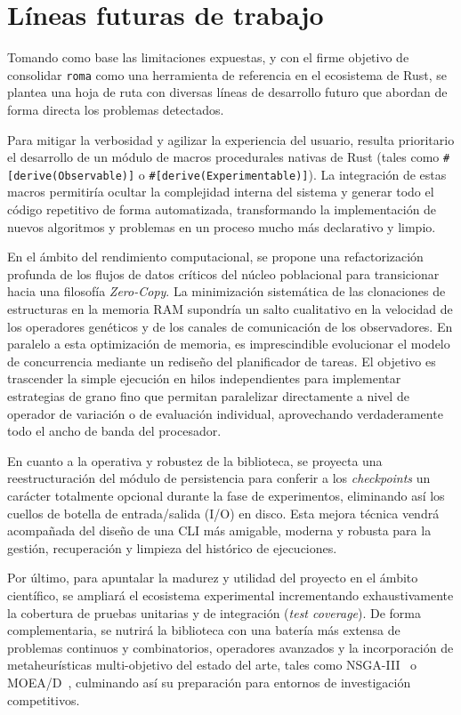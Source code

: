 \documentclass[12pt,a4paper,twoside,openright]{book}
\begin{document}
\section{Líneas futuras de trabajo}
    Tomando como base las limitaciones expuestas, y con el firme objetivo de consolidar \texttt{roma} como una herramienta de referencia en el ecosistema de Rust, se plantea una hoja de ruta con diversas líneas de desarrollo futuro que abordan de forma directa los problemas detectados.

    Para mitigar la verbosidad y agilizar la experiencia del usuario, resulta prioritario el desarrollo de un módulo de macros procedurales nativas de Rust (tales como \texttt{\#[derive(Observable)]} o \texttt{\#[derive(Experimentable)]}). La integración de estas macros permitiría ocultar la complejidad interna del sistema y generar todo el código repetitivo de forma automatizada, transformando la implementación de nuevos algoritmos y problemas en un proceso mucho más declarativo y limpio.

    En el ámbito del rendimiento computacional, se propone una refactorización profunda de los flujos de datos críticos del núcleo poblacional para transicionar hacia una filosofía \textit{Zero-Copy}. La minimización sistemática de las clonaciones de estructuras en la memoria RAM supondría un salto cualitativo en la velocidad de los operadores genéticos y de los canales de comunicación de los observadores. En paralelo a esta optimización de memoria, es imprescindible evolucionar el modelo de concurrencia mediante un rediseño del planificador de tareas. El objetivo es trascender la simple ejecución en hilos independientes para implementar estrategias de grano fino que permitan paralelizar directamente a nivel de operador de variación o de evaluación individual, aprovechando verdaderamente todo el ancho de banda del procesador.

    En cuanto a la operativa y robustez de la biblioteca, se proyecta una reestructuración del módulo de persistencia para conferir a los \textit{checkpoints} un carácter totalmente opcional durante la fase de experimentos, eliminando así los cuellos de botella de entrada/salida (I/O) en disco. Esta mejora técnica vendrá acompañada del diseño de una CLI más amigable, moderna y robusta para la gestión, recuperación y limpieza del histórico de ejecuciones. 

    Por último, para apuntalar la madurez y utilidad del proyecto en el ámbito científico, se ampliará el ecosistema experimental incrementando exhaustivamente la cobertura de pruebas unitarias y de integración (\textit{test coverage}). De forma complementaria, se nutrirá la biblioteca con una batería más extensa de problemas continuos y combinatorios, operadores avanzados y la incorporación de metaheurísticas multi-objetivo del estado del arte, tales como NSGA-III~\cite{Deb2014NSGAIII} o MOEA/D~\cite{Zhang2007MOEAD}, culminando así su preparación para entornos de investigación competitivos.
\end{document}
